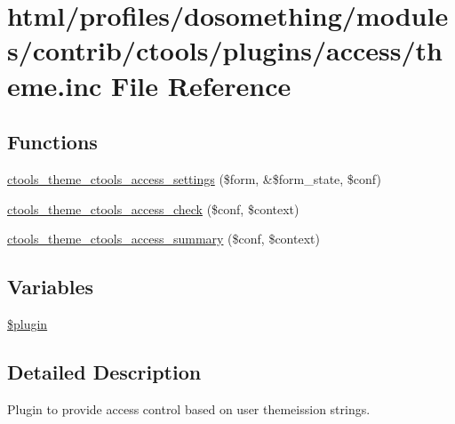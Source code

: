 \hypertarget{ctools_2plugins_2access_2theme_8inc}{
\section{html/profiles/dosomething/modules/contrib/ctools/plugins/access/theme.inc File Reference}
\label{ctools_2plugins_2access_2theme_8inc}
}
\subsection*{Functions}
\begin{DoxyCompactItemize}
\item 
\hyperlink{ctools_2plugins_2access_2theme_8inc_a7cae29c0d6f17e425b3ef4beaf216642}{ctools\_\-theme\_\-ctools\_\-access\_\-settings} (\$form, \&\$form\_\-state, \$conf)
\item 
\hyperlink{ctools_2plugins_2access_2theme_8inc_ad933255384d9eb5379800d342568a639}{ctools\_\-theme\_\-ctools\_\-access\_\-check} (\$conf, \$context)
\item 
\hyperlink{ctools_2plugins_2access_2theme_8inc_a84b5a26f3810000d996117a936fd5737}{ctools\_\-theme\_\-ctools\_\-access\_\-summary} (\$conf, \$context)
\end{DoxyCompactItemize}
\subsection*{Variables}
\begin{DoxyCompactItemize}
\item 
\hyperlink{ctools_2plugins_2access_2theme_8inc_ada8a7130088351710bb02ed622d6bf65}{\$plugin}
\end{DoxyCompactItemize}


\subsection{Detailed Description}
Plugin to provide access control based on user themeission strings. 

